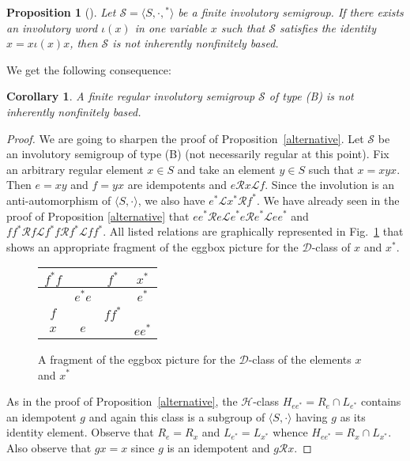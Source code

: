 \documentclass[11pt,reqno]{amsart}
\def\Rc{\mathrel{\mathscr{R}}}
\def\Lc{\mathrel{\mathscr{L}}}
\newcommand{\fis}{finite involutory semi\-group}
\newcommand{\infb}{inherently non\-finitely based}
\newtheorem{Prop}[Thm]{Proposition}
\newtheorem{Cor}[Thm]{Corollary}
\begin{document}
\begin{Prop}[{\mdseries\cite[Proposition~2.9]{ADV:2012}}]
\label{NINFB} Let $\mathcal{S}=\langle S,\cdot,{}^*\rangle$ be a \fis. If there exists an involutory word $\iota\!(x)$ in one variable $x$ such
that $\mathcal{S}$ satisfies the identity $x=x\iota\!(x)x$, then $\mathcal{S}$ is not \infb.
\end{Prop}
We get the following consequence:
\begin{Cor}\label{regular}
A finite regular involutory semigroup $\mathcal{S}$ of type (B) is not inherently nonfinitely based.
\end{Cor}
\begin{proof}
We are going to sharpen the proof of Proposition~\ref{alternative}. Let $\mathcal{S}$ be an  involutory semigroup of type (B) (not
necessarily regular at this point). Fix an arbitrary regular element $x\in S$  and take an element $y\in S$   such that $x=xyx$. Then
$e=xy$ and $f=yx$ are idempotents and $e\Rc x\Lc f$. Since the involution is an anti-automorphism of $\langle S,\cdot\rangle$, we also have
$e^*\Lc x^*\Rc f^*$. We have already seen in the proof of Proposition \ref{alternative} that $ee^*\Rc e\Lc e^*e\Rc e^*\Lc ee^*$ and
$ff^*\Rc f\Lc f^*f\Rc f^*\Lc ff^*$.  All listed relations are graphically represented in Fig.~\ref{fig:D-class} that shows an appropriate
fragment of the eggbox picture for the $\mathscr{D}$-class of $x$ and $x^*$.
\begin{figure}[th]
\begin{center}
{\large \begin{tabular}{|c|c|c|c|}

\hline $f^*f$\rule[-5pt]{0pt}{16pt} & & $f^*$ & $x^*$ \\
\hline \rule[-5pt]{0pt}{16pt}& $e^*e$  & & $e^*$\\
\hline $f$\rule[-5pt]{0pt}{16pt} & \phantom{$f^*f$} & $ff^*$ &  \phantom{$f^*f$}\\
\hline $x$\rule[-5pt]{0pt}{16pt} & $e$ & & $ee^*$\\
\hline
\end{tabular}}
\caption{A fragment of the eggbox picture for the $\mathscr{D}$-class of the elements $x$ and $x^*$}\label{fig:D-class}
\end{center}
\end{figure}

As in the proof of Proposition~\ref{alternative}, the $\mathscr{H}$-class $H_{ee^*}=R_e\cap L_{e^*}$ contains an idempotent $g$ and again
this class is a subgroup of $\langle S,\cdot\rangle$ having $g$ as its identity element. Observe that $R_e=R_x$ and $L_{e^*}=L_{x^*}$
whence $H_{ee^*}=R_x\cap L_{x^*}$. Also observe that $gx=x$ since $g$ is an idempotent and $g\Rc x$.


\end{proof}
\end{document}

